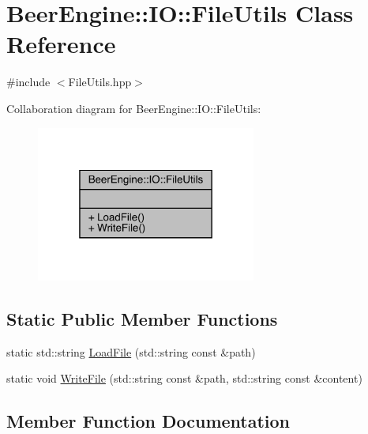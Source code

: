\hypertarget{class_beer_engine_1_1_i_o_1_1_file_utils}{}\section{Beer\+Engine\+:\+:IO\+:\+:File\+Utils Class Reference}
\label{class_beer_engine_1_1_i_o_1_1_file_utils}


{\ttfamily \#include $<$File\+Utils.\+hpp$>$}



Collaboration diagram for Beer\+Engine\+:\+:IO\+:\+:File\+Utils\+:\nopagebreak
\begin{figure}[H]
\begin{center}
\leavevmode
\includegraphics[width=205pt]{class_beer_engine_1_1_i_o_1_1_file_utils__coll__graph}
\end{center}
\end{figure}
\subsection*{Static Public Member Functions}
\begin{DoxyCompactItemize}
\item 
static std\+::string \mbox{\hyperlink{class_beer_engine_1_1_i_o_1_1_file_utils_a42d1afff6c3454c1ff4aa6b691a1c963}{Load\+File}} (std\+::string const \&path)
\item 
static void \mbox{\hyperlink{class_beer_engine_1_1_i_o_1_1_file_utils_ac58ded74238ff6180e72e4b2f0be6b81}{Write\+File}} (std\+::string const \&path, std\+::string const \&content)
\end{DoxyCompactItemize}


\subsection{Member Function Documentation}
\mbox{\label{class_beer_engine_1_1_i_o_1_1_file_utils_a42d1afff6c3454c1ff4aa6b691a1c963}} 
